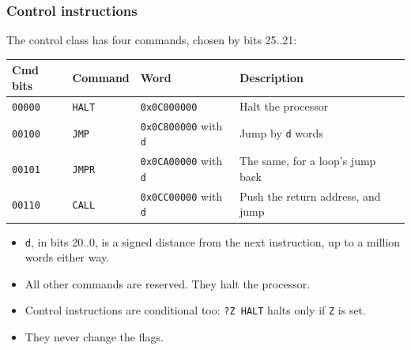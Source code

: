 \documentclass{beamer}
\newcommand{\code}[1]{\texttt{#1}}
\begin{document}
   \begin{frame}
    \frametitle{Control instructions}
    The control class has four commands, chosen by bits 25..21:
    {\footnotesize
    \begin{center}
     \begin{tabular}{|l|l|l|l|}
      \hline
       Cmd bits&Command&Word&Description\\
      \hline
      \hline
       \code{00000}&\code{HALT}&\code{0x0C000000}&Halt the processor\\
       \code{00100}&\code{JMP}&\code{0x0C800000} with \code{d}&Jump by \code{d} words\\
       \code{00101}&\code{JMPR}&\code{0x0CA00000} with \code{d}&The same, for a loop's jump back\\
       \code{00110}&\code{CALL}&\code{0x0CC00000} with \code{d}&Push the return address, and jump\\
      \hline
     \end{tabular}
    \end{center}
    }
    \begin{itemize}
     \item \code{d}, in bits 20..0, is a signed distance from the next
      instruction, up to a million words either way.
     \item All other commands are reserved. They halt the processor.
     \item Control instructions are conditional too:
      \code{?Z HALT} halts only if \code{Z} is set.
     \item They never change the flags.
    \end{itemize}
   \end{frame}
%
\end{document}
